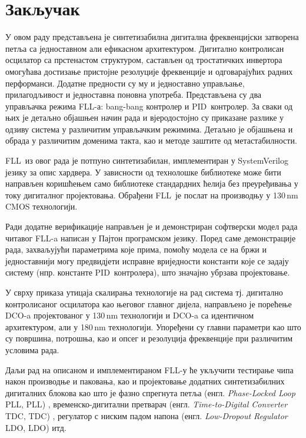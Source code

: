\documentclass[master]{finthesis}
\makeatletter
\newcommand*{\engl}[2][\@empty]{%
    \edef\theacronym{#1}%
    (енгл. \foreignlanguage{english}{\emph{#2}%
    \ifx\theacronym\@empty \else , #1\fi})%
}
\def \FLL  {FLL} %
\def \DCO  {DCO} %
\def \PID  {PID} %
\makeatother
\begin{document}
\section{Закључак} \label{Conclusion}
У овом раду представљена је синтетизабилна дигитална фреквенцијски затворена петља са једноставном али ефикасном архитектуром. Дигитално контролисан осцилатор са прстенастом структуром, састављен од тростатичких инвертора омогућава достизање пристојне резолуције фреквенције и одговарајућих радних перформанси. Додатне предности су му и једноставно управљање, прилагодљивост и једноставна поновна употреба. Представљена су два управљачка режима \FLL-а: bang-bang контролер и \PID\ контролер. За сваки од њих је детаљно објашњен начин рада и вјеродостојно су приказане разлике у одзиву система у различитим управљачким режимима. Детаљно је објашњена и обрада у различитим доменима такта, као и методе заштите од метастабилности. \par
\FLL\ из овог рада је потпуно синтетизабилан, имплементиран у SystemVerilog језику за опис хардвера. У зависности од технолошке библиотеке може бити направљен коришћењем само библиотеке стандардних ћелија без преуређивања у току дигиталног пројектовања. Обрађени \FLL\ је послат на производњу у 130\,nm CMOS технологији. \par
Ради додатне верификације направљен је и демонстриран софтверски модел рада читавог \FLL-a написан у Пајтон програмском језику. Поред саме демонстрације рада, захваљујући параметрима које прима, помоћу модела се на бржи и једноставнији могу предвидјети исправне вриједности константи које се задају систему (нпр. константе \PID\ контролера), што значајно убрзава пројектовање.\par
У сврху приказа утицаја скалирања технологије на рад система тј. дигитално контролисаног осцилатора као његовог главног дијела, направљено је порећење \DCO-a пројектованог у 130\,nm технологији и \DCO-a са идентичном архитектуром, али у 180\,nm технологији. Упоређени су главни параметри као што су површина, потрошња, као и опсег и резолуција фреквенције при различитим условима рада. \par
Даљи рад на описаном и имплементираном \FLL-у ће укључити тестирање чипа након производње и паковања, као и пројектовање додатних синтетизабилних дигиталних блокова као што је фазно спрегнута петља \engl[PLL]{Phase-Locked Loop}, временско-дигитални претварач \engl[TDC]{Time-to-Digital Converter}, регулатор с ниским падом напона \engl[LDO]{Low-Dropout Regulator} итд.


\makebibliography

\newrefsection
\nocite{*}
{\let\section\oldsection
\printbibliography[keyword=Frequency-locked loop, heading=bibintoc, title={Објављени радови}, resetnumbers]}
\end{document}
